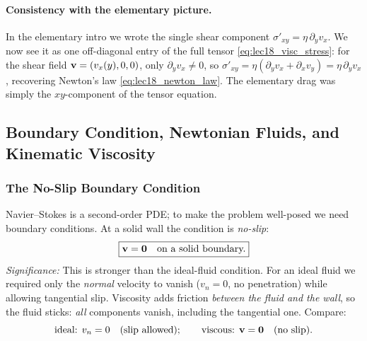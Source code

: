 \documentclass[../main.tex]{subfiles}
\begin{document}

\paragraph{Consistency with the elementary picture.} In the elementary intro we wrote the single shear component $\sigma'_{xy}=\eta\,\partial_y v_x$. We now see it as one off-diagonal entry of the full tensor \eqref{eq:lec18_visc_stress}: for the shear field $\mathbf{v}=(v_x(y),0,0)$, only $\partial_y v_x\ne 0$, so $\sigma'_{xy}=\eta(\partial_y v_x+\partial_x v_y)=\eta\,\partial_y v_x$, recovering Newton's law \eqref{eq:lec18_newton_law}. The elementary drag was simply the $xy$-component of the tensor equation.

\subsection{Boundary Condition, Newtonian Fluids, and Kinematic Viscosity}\label{sec:lec18:bc_nu}

\subsubsection*{The No-Slip Boundary Condition}
Navier--Stokes is a second-order PDE; to make the problem well-posed we need boundary conditions. At a solid wall the condition is \emph{no-slip}:
\begin{equation}
  \boxed{\mathbf{v} = \mathbf{0} \quad\text{on a solid boundary.}}
  \label{eq:lec18_noslip}
\end{equation}
\textit{Significance:} This is stronger than the ideal-fluid condition. For an ideal fluid we required only the \emph{normal} velocity to vanish ($v_n=0$, no penetration) while allowing tangential slip. Viscosity adds friction \emph{between the fluid and the wall}, so the fluid sticks: \emph{all} components vanish, including the tangential one. Compare:
\begin{equation}
  \text{ideal: } v_n = 0 \quad\text{(slip allowed)};\qquad
  \text{viscous: } \mathbf{v} = \mathbf{0} \quad\text{(no slip).}
  \label{eq:lec18_bc_compare}
\end{equation}
\end{document}
